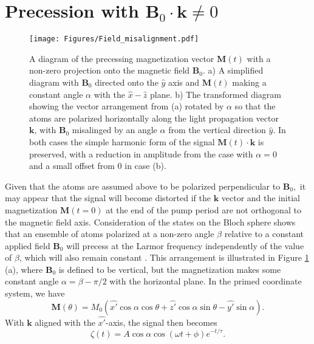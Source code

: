 \documentclass [10pt, twoside] {uwthesis}[2012/04/02]
\begin{document}
\section{Precession with $\mathbf{B}_0 \cdot \mathbf{k} \neq 0 $}
\begin{figure}
\begin{center}
\texttt{[image: Figures/Field\_misalignment.pdf]}
\end{center}
\caption[Precession with mis-aligned fields]%
{\narrower A diagram of the precessing magnetization vector $\mathbf{M}(t)$ with a non-zero projection onto the magnetic field $\mathbf{B}_0.$ a) A simplified diagram with $\mathbf{B}_0$ directed onto the $\hat{y}$ axis and $\mathbf{M}(t)$ making a constant angle $\alpha$ with the $\hat{x}-\hat{z}$ plane. b) The transformed diagram showing the vector arrangement from (a) rotated by $\alpha$ so that the atoms are polarized horizontally along the light propagation vector $\mathbf{k}$, with $\mathbf{B}_0$ misalinged by an angle $\alpha$ from the vertical direction $\hat{y}$. In both cases the simple harmonic form of the signal $\mathbf{M}(t) \cdot \mathbf{k}$ is preserved, with a reduction in amplitude from the case with $\alpha = 0$ and a small offset from 0 in case (b).}
\label{FieldMisalign}
\end{figure}
Given that the atoms are assumed above to be polarized perpendicular to $\mathbf{B}_0,$ it may appear that the signal will become distorted if the $\mathbf{k}$ vector and the initial magnetization $\mathbf{M}(t=0)$ at the end of the pump period are not orthogonal to the magnetic field axis. Consideration of the states on the Bloch sphere shows that an ensemble of atoms polarized at a non-zero angle $\beta$ relative to a constant applied field $\mathbf{B}_0$ will precess at the Larmor frequency independently of the value of $\beta$, which will also remain constant \cite[7.3]{Foot}. This arrangement is illustrated in Figure \ref{FieldMisalign} (a), where $\mathbf{B}_0$ is defined to be vertical, but the magnetization makes some constant angle $\alpha = \beta-\pi/2$ with the horizontal plane. In the primed coordinate system, we have
\begin{equation}
\mathbf{M}(\theta) = M_0(\hat{x'}\cos\alpha\cos\theta + \hat{z'}\cos\alpha\sin\theta  - \hat{y'}\sin\alpha). 
\end{equation}
With $\mathbf{k}$ aligned with the $\hat{x'}$-axis, the signal then becomes
\begin{equation}
\zeta(t) = A\cos\alpha\cos(\omega t + \phi) e^{-t/\tau}.
\end{equation}
\end{document}
